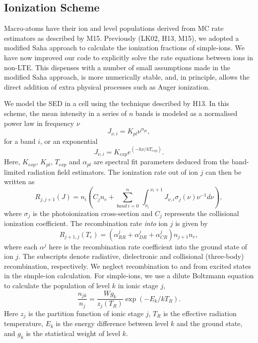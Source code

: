 \documentclass[useAMS,usenatbib]{mn2e_x}
\begin{document}
\subsection{Ionization Scheme}

Macro-atoms have their ion and level populations derived from
MC rate estimators as described by M15. Previously (LK02, H13, M15),
we adopted a modified Saha approach to calculate the ionization fractions
of simple-ions. We have now improved our code to explicitly solve the 
rate equations between ions in non-LTE. 
This dispenses with a number of small assumptions made in the modified Saha approach, 
is more numerically stable, 
and, in principle, allows the direct addition of extra physical 
processes such as Auger ionization.

We model the SED in a cell using the technique described by H13. In this scheme,
the mean intensity in a series of $n$ bands is modeled as a normalised power law in 
frequency $\nu$
\begin{equation}
J_{\nu,i}=K_{pl}\nu^{\alpha_{pl}},
\end{equation}
for a band $i$, or an exponential 
\begin{equation}
J_{\nu,i}=K_{exp} e^{(-h\nu/k T_{exp})}.
\end{equation}
Here, $K_{exp}$, $K_{pl}$, $T_{exp}$ and $\alpha_{pl}$ are spectral fit parameters
deduced from the band-limited radiation field estimators.
The ionization rate out of ion $j$ can then be written as 
\begin{equation}
R_{j,j+1}(J)= 
\displaystyle{
n_i \left(C_{j} n_e + 
\sum_{band~i=0}^{n}~
{\int_{\nu_i}^{~\nu_i+1}{J_{\nu,i}\sigma_j(\nu)\nu^{-1}d\nu}}
\right),}
\end{equation}
where $\sigma_j$ is the photoionization cross-section and $C_{j}$
represents the collisional ionization coefficient.
The recombination rate {\em into} ion $j$ is given by 
\begin{equation}
R_{j+1,j}(T_e) = (\alpha^j_{RR} + \alpha^j_{DR} + \alpha^j_{CR}) n_{j+1} n_e,
\end{equation}
where each $\alpha^j$ here is the recombination rate coefficient into the ground state of ion $j$.
The subscripts denote radiative, dielectronic and 
collisional (three-body) recombination, respectively.
We neglect recombination to and from excited states in the simple-ion calculation. 
For simple-ions, we use a dilute Boltzmann equation to calculate 
the population of level $k$ in ionic stage $j$,
\begin{equation}
\frac{n_{jk}}{n_j} = \frac{W g_k}{z_j(T_R)} \exp(-E_k/kT_R).
\end{equation}
Here $z_j$ is the partition function of ionic stage $j$,
$T_R$ is the effective radiation temperature,
$E_k$ is the energy difference between level $k$ and the ground state,
and $g_k$ is the statistical weight of level $k$. 
\end{document}

